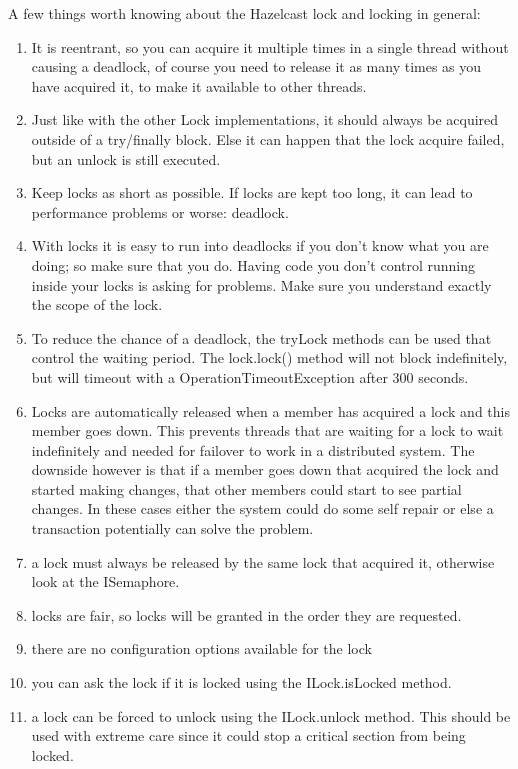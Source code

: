 A few things worth knowing about the Hazelcast lock and locking in general:
\begin{enumerate}
\item It is reentrant, so you can acquire it multiple times in a single thread without causing a deadlock, of course you need to release it as many times as you have acquired it, to make it available to other threads.
\item Just like with the other Lock implementations, it should always be acquired outside of a try/finally block. Else it can happen that the lock acquire failed, but an unlock is still executed. 
\item Keep locks as short as possible. If locks are kept too long, it can lead to performance problems or worse: deadlock.
\item With locks it is easy to run into deadlocks if you don't know what you are doing; so make sure that you do. Having code you don't control running inside your locks is asking for problems. Make sure you understand exactly the scope of the lock. 
\item To reduce the chance of a deadlock, the tryLock methods can be used that control the waiting period. The lock.lock() method will not block indefinitely, but will timeout with a OperationTimeoutException after 300 seconds.  
\item Locks are automatically released when a member has acquired a lock and this member goes down. This prevents threads that are waiting for a lock to wait indefinitely and needed for failover to work in a distributed system. The downside however is that if a member goes down that acquired the lock and started making changes, that other members could start to see partial changes. In these cases either the system could do some self repair or else a transaction potentially can solve the problem.
\item a lock must always be released by the same lock that acquired it, otherwise look at the ISemaphore.
\item locks are fair, so locks will be granted in the order they are requested.
\item there are no configuration options available for the lock
\item you can ask the lock if it is locked using the ILock.isLocked method.
\item a lock can be forced to unlock using the ILock.unlock method. This should be used with extreme care since it could stop a critical section from being locked. 
\end{enumerate}

